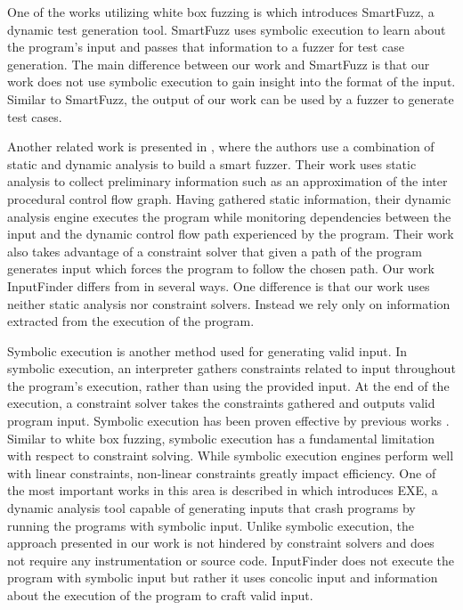\documentclass{acm_proc_article-sp}
\def \tool {InputFinder}
\begin{document}
One of the works utilizing white box fuzzing is \cite{molnar2009dynamic} which introduces SmartFuzz, a dynamic test generation tool.
SmartFuzz uses symbolic execution to learn about the program's input and passes that information to a fuzzer for test case generation.
The main difference between our work and SmartFuzz is that our work does not use symbolic execution to gain insight into the format of the input.
Similar to SmartFuzz, the output of our work can be used by a fuzzer to generate test cases.

Another related work is presented in \cite{smartfuzzer}, where the authors use a combination of static and dynamic analysis to build a smart fuzzer.
Their work uses static analysis to collect preliminary information such as an approximation of the inter procedural control flow graph.
Having gathered static information, their dynamic analysis engine executes the program while monitoring dependencies between the input and the dynamic control flow path experienced by the program.
Their work also takes advantage of a constraint solver that given a path of the program generates input which forces the program to follow the chosen path.
Our work \tool{} differs from \cite{smartfuzzer} in several ways.
One difference is that our work uses neither static analysis nor constraint solvers.
Instead we rely only on information extracted from the execution of the program. 

Symbolic execution is another method used for generating valid input.
In symbolic execution, an interpreter gathers constraints related to input throughout the program's execution, rather than using the provided input.
At the end of the execution, a constraint solver takes the constraints gathered and outputs valid program input.
Symbolic execution has been proven effective by previous works \cite{symbolicexecution, exesymex}.
Similar to white box fuzzing, symbolic execution has a fundamental limitation with respect to constraint solving.
While symbolic execution engines perform well with linear constraints, non-linear constraints greatly impact efficiency.
One of the most important works in this area is described in \cite{exesymex} which introduces EXE, a dynamic analysis tool capable of generating inputs that crash programs by running the programs with symbolic input.
Unlike symbolic execution, the approach presented in our work is not hindered by constraint solvers and does not require any instrumentation or source code.
\tool{} does not execute the program with symbolic input but rather it uses concolic input and information about the execution of the program to craft valid input.
\end{document}

